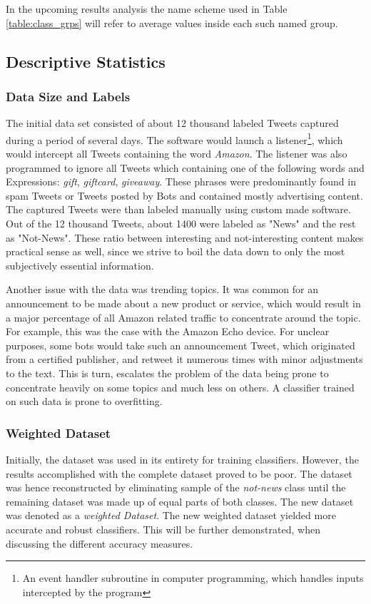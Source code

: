 		In the upcoming results analysis the name scheme used in Table \ref{table:class_grps} will refer to average values inside each such named group. 
	
	\subsection{Descriptive Statistics}
		
		\subsubsection{Data Size and Labels}
			The initial data set consisted of about 12 thousand labeled Tweets captured during a period of several days. The software would launch a listener\footnote{\vspace{0.01cm} An event handler subroutine in computer programming, which handles inputs intercepted by the program}, which would intercept all Tweets containing the word \textit{Amazon}. The listener was also programmed to ignore all Tweets which containing one of the following words and Expressions: \textit{gift}, \textit{giftcard}, \textit{giveaway}. These phrases were predominantly found in spam Tweets or Tweets posted by Bots and contained mostly advertising content. The captured Tweets were than labeled manually using custom made software. Out of the 12 thousand Tweets, about 1400 were labeled as "News" and the rest as "Not-News". These ratio between interesting and not-interesting content makes practical sense as well, since we strive to boil the data down to only the most subjectively essential information. 
			
			\par
			
			Another issue with the data was trending topics. It was common for an announcement to be made about a new product or service, which would result in a major percentage of all Amazon related traffic to concentrate around the topic. For example, this was the case with the Amazon Echo device. For unclear purposes, some bots would take such an announcement Tweet, which originated from a certified publisher, and retweet it numerous times with minor adjustments to the text. This is turn, escalates the problem of the data being prone to concentrate heavily on some topics and much less on others. A classifier trained on such data is prone to overfitting.
			
		\subsubsection{Weighted Dataset}
			\label{sec:Weighted}
			Initially, the dataset was used in its entirety for training classifiers. However, the results accomplished with the complete dataset proved to be poor. The dataset was hence reconstructed by eliminating sample of the \textit{not-news} class until the remaining dataset was made up of equal parts of both classes. The new dataset was denoted as a \textit{weighted Dataset}. The new weighted dataset yielded more accurate and robust classifiers. This will be further demonstrated, when discussing the different accuracy measures.
			
